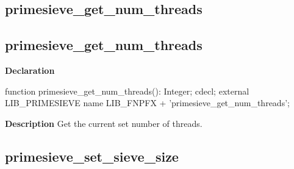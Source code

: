 \documentclass{report}
\newif\ifpdf
\begin{document}
\subsection*{\large{\textbf{primesieve{\_}get{\_}num{\_}threads}}\normalsize\hspace{1ex}\hrulefill}
\else
\subsection*{primesieve{\_}get{\_}num{\_}threads}
\fi
\label{primesieve-primesieve_get_num_threads}
\begin{list}{}{
\setlength{\itemindent}{0cm}
\setlength{\listparindent}{0cm}
\setlength{\leftmargin}{\evensidemargin}
\addtolength{\leftmargin}{\tmplength}
\settowidth{\labelsep}{X}
\addtolength{\leftmargin}{\labelsep}
\setlength{\labelwidth}{\tmplength}
}
\item[\textbf{Declaration}\hfill]
\ifpdf
\begin{flushleft}
\fi
\begin{ttfamily}
function primesieve{\_}get{\_}num{\_}threads(): Integer; cdecl; external LIB{\_}PRIMESIEVE name LIB{\_}FNPFX + 'primesieve{\_}get{\_}num{\_}threads';\end{ttfamily}

\ifpdf
\end{flushleft}
\fi

\par
\item[\textbf{Description}]
Get the current set number of threads.

\end{list}
\ifpdf
\subsection*{\large{\textbf{primesieve{\_}set{\_}sieve{\_}size}}\normalsize\hspace{1ex}\hrulefill}
\else
\end{document}
